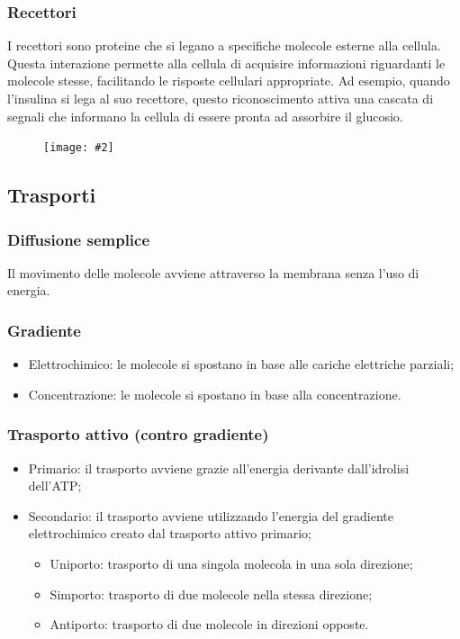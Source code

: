 \documentclass{article}
\newcommand{\cfig}[2]{
    \phantom{}
    \begin{figure}[ht!]
        \begin{center}
            \texttt{[image: \#2]}
        \end{center}
    \end{figure}
}
\begin{document}
\subsubsection{Recettori}
I recettori sono proteine che si legano a specifiche molecole esterne alla cellula.
Questa interazione permette alla cellula di acquisire informazioni riguardanti le molecole
stesse, facilitando le risposte cellulari appropriate. Ad esempio, quando l'insulina si lega
al suo recettore, questo riconoscimento attiva una cascata di segnali che informano la cellula
di essere pronta ad assorbire il glucosio.

\newpage
\cfig{.9}{media/proteine_membrana.png}

\subsection{Trasporti}
\subsubsection{Diffusione semplice}
Il movimento delle molecole avviene attraverso la membrana senza l'uso di energia.

\subsubsection{Gradiente}
\begin{itemize}
    \item Elettrochimico: le molecole si spostano in base alle cariche elettriche parziali;
    \item Concentrazione: le molecole si spostano in base alla concentrazione.
\end{itemize}

\subsubsection{Trasporto attivo (contro gradiente)}
\begin{itemize}
    \item Primario: il trasporto avviene grazie all'energia derivante dall'idrolisi dell'ATP;
    \item Secondario: il trasporto avviene utilizzando l'energia del gradiente elettrochimico
        creato dal trasporto attivo primario;
        \begin{itemize}
            \item Uniporto: trasporto di una singola molecola in una sola direzione;
            \item Simporto: trasporto di due molecole nella stessa direzione;
            \item Antiporto: trasporto di due molecole in direzioni opposte.
        \end{itemize}
\end{itemize}
\end{document}
